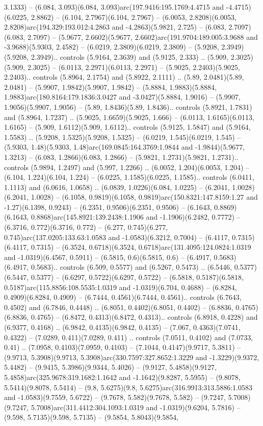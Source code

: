3.1333) -- (6.084, 3.093)(6.084, 3.093)arc(197.9416:195.1769:4.4715 and -4.4715)(6.0225, 2.8862) -- (6.104, 2.7967)(6.104, 2.7967) -- (6.0053, 2.8208)(6.0053, 2.8208)arc(194.329:193.012:4.2863 and -4.2863)(5.9821, 2.725) -- (6.083, 2.7097)(6.083, 2.7097) -- (5.9677, 2.6602)(5.9677, 2.6602)arc(191.9704:189.005:3.9688 and -3.9688)(5.9303, 2.4582) -- (6.0219, 2.3809)(6.0219, 2.3809) -- (5.9208, 2.3949)(5.9208, 2.3949).. controls (5.9164, 2.3639) and (5.9125, 2.333) .. (5.909, 2.3025)(5.909, 2.3025) -- (6.0113, 2.2971)(6.0113, 2.2971) -- (5.9025, 2.2403)(5.9025, 2.2403).. controls (5.8964, 2.1754) and (5.8922, 2.1111) .. (5.89, 2.0481)(5.89, 2.0481) -- (5.9907, 1.9842)(5.9907, 1.9842) -- (5.8884, 1.9883)(5.8884, 1.9883)arc(180.8164:179.1836:3.0427 and -3.0427)(5.8884, 1.9016) -- (5.9907, 1.9056)(5.9907, 1.9056) -- (5.89, 1.8436)(5.89, 1.8436).. controls (5.8921, 1.7831) and (5.8964, 1.7237) .. (5.9025, 1.6659)(5.9025, 1.666) -- (6.0113, 1.6165)(6.0113, 1.6165) -- (5.909, 1.6112)(5.909, 1.6112).. controls (5.9125, 1.5847) and (5.9164, 1.5583) .. (5.9208, 1.5325)(5.9208, 1.5325) -- (6.0219, 1.545)(6.0219, 1.545) -- (5.9303, 1.48)(5.9303, 1.48)arc(169.0845:164.3769:1.9844 and -1.9844)(5.9677, 1.3213) -- (6.083, 1.2866)(6.083, 1.2866) -- (5.9821, 1.2731)(5.9821, 1.2731).. controls (5.9894, 1.2497) and (5.997, 1.2266) .. (6.0052, 1.204)(6.0053, 1.204) -- (6.104, 1.224)(6.104, 1.224) -- (6.0225, 1.1585)(6.0225, 1.1585).. controls (6.0411, 1.1113) and (6.0616, 1.0658) .. (6.0839, 1.0226)(6.084, 1.0225) -- (6.2041, 1.0028)(6.2041, 1.0028) -- (6.1058, 0.9819)(6.1058, 0.9819)arc(150.8321:147.8159:1.27 and -1.27)(6.1398, 0.9243) -- (6.2351, 0.9506)(6.2351, 0.9506) -- (6.1643, 0.8869)(6.1643, 0.8868)arc(145.8921:139.2438:1.1906 and -1.1906)(6.2482, 0.7772) -- (6.3716, 0.772)(6.3716, 0.772) -- (6.277, 0.745)(6.277, 0.745)arc(137.0205:133.63:1.0583 and -1.0583)(6.3212, 0.7004) -- (6.4117, 0.7315)(6.4117, 0.7315) -- (6.3524, 0.6718)(6.3524, 0.6718)arc(131.4095:124.0824:1.0319 and -1.0319)(6.4567, 0.5911) -- (6.5815, 0.6)(6.5815, 0.6) -- (6.4917, 0.5683)(6.4917, 0.5683).. controls (6.509, 0.5577) and (6.5267, 0.5473) .. (6.5446, 0.5377)(6.5447, 0.5377) -- (6.6297, 0.5722)(6.6297, 0.5722) -- (6.5818, 0.5187)(6.5818, 0.5187)arc(115.8856:108.5535:1.0319 and -1.0319)(6.704, 0.4688) -- (6.8284, 0.4909)(6.8284, 0.4909) -- (6.7444, 0.4561)(6.7444, 0.4561).. controls (6.7643, 0.4502) and (6.7846, 0.4448) .. (6.8051, 0.4402)(6.8051, 0.4402) -- (6.8836, 0.4765)(6.8836, 0.4765) -- (6.8472, 0.4313)(6.8472, 0.4313).. controls (6.8918, 0.4228) and (6.9377, 0.4168) .. (6.9842, 0.4135)(6.9842, 0.4135) -- (7.067, 0.4363)(7.0741, 0.4322) -- (7.0289, 0.411)(7.0289, 0.411) .. controls (7.0511, 0.4102) and (7.0733, 0.41) .. (7.0958, 0.4103)(7.0959, 0.4103) -- (7.1044, 0.4147)(9.9717, 5.3811) -- (9.9713, 5.3908)(9.9713, 5.3908)arc(330.7597:327.8652:1.3229 and -1.3229)(9.9372, 5.4482) -- (9.9415, 5.3986)(9.9344, 5.4026) -- (9.9127, 5.4858)(9.9127, 5.4858)arc(325.9678:319.1682:1.1642 and -1.1642)(9.8287, 5.5955) -- (9.8078, 5.5414)(9.8078, 5.5414) -- (9.8, 5.6275)(9.8, 5.6275)arc(316.9913:313.5886:1.0583 and -1.0583)(9.7559, 5.6722) -- (9.7678, 5.582)(9.7678, 5.582) -- (9.7247, 5.7008)(9.7247, 5.7008)arc(311.4412:304.1093:1.0319 and -1.0319)(9.6204, 5.7816) -- (9.598, 5.7135)(9.598, 5.7135) -- (9.5854, 5.8043)(9.5854, 